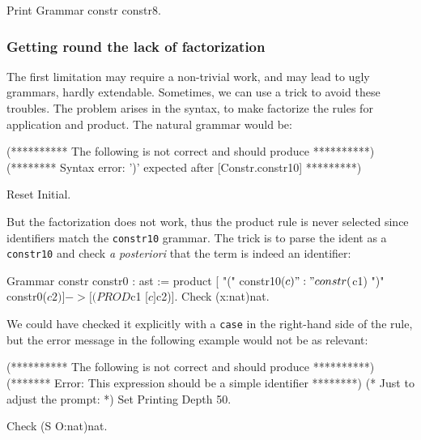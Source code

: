 \begin{coq_example}
Print Grammar constr constr8.
\end{coq_example}

\subsubsection{Getting round the lack of factorization}
The first limitation may require a non-trivial work, and may lead to
ugly grammars, hardly extendable. Sometimes, we can use a trick to
avoid these troubles. The problem arises in the {\gallina} syntax, to
make {\camlpppp} factorize the rules for application and product. The
natural grammar would be:

\begin{coq_eval}
(********** The following is not correct and should produce **********)
(******** Syntax error: ')' expected after [Constr.constr10] *********)
\end{coq_eval}

\begin{coq_eval}
Reset Initial.
\end{coq_eval}

But the factorization does not work, thus the product rule is never
selected since identifiers match the {\tt constr10} grammar. The
trick is to parse the ident as a {\tt constr10} and check \emph{a
posteriori} that the term is indeed an identifier:

\begin{coq_example}
Grammar constr constr0 : ast :=
  product [ "(" constr10($c) ":" constr($c1) ")" constr0($c2) ] ->
            [(PROD $c1 [$c]$c2)].
Check (x:nat)nat.
\end{coq_example}

\noindent We could have checked it explicitly with a {\tt case} in
the right-hand side of the rule, but the error message in the
following example would not be as relevant:

\begin{coq_eval}
(********** The following is not correct and should produce **********)
(******* Error: This expression should be a simple identifier ********)
(* Just to adjust the prompt: *) Set Printing Depth 50.
\end{coq_eval}
\begin{coq_example}
Check (S O:nat)nat.
\end{coq_example}

